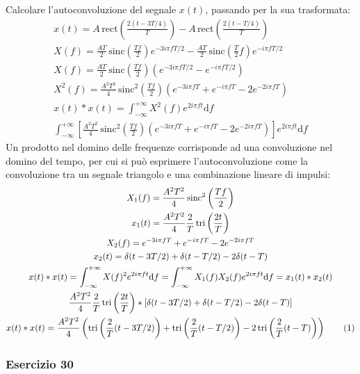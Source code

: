 \documentclass{article}
\newcommand{\rect}{\mathrm{rect}}
\newcommand{\sinc}{\mathrm{sinc}}
\newcommand{\tri}{\mathrm{tri}}
\newcommand{\df}{\mathrm{d}}
\newcommand{\tageq}{\tag{\stepcounter{equation}\theequation}}
\begin{document}
Calcolare l'autoconvoluzione del segnale $x(t)$, passando per la sua trasformata: 
\begin{gather*}
    x(t)=A\,\rect\displaystyle\left(\frac{2(t-3T/4)}{T}\right)-A\,\rect\displaystyle\left(\frac{2(t-T/4)}{T}\right)\\
    X(f)=\displaystyle\frac{AT}{2}\,\sinc\left(\frac{Tf}{2}\right)e^{-3i\pi fT/2}-\displaystyle\frac{AT}{2}\,\sinc\left(\frac{T}{2}f\right)e^{-i\pi fT/2}\\
    X(f)=\displaystyle\frac{AT}{2}\,\sinc\left(\frac{Tf}{2}\right)\left(e^{-3i\pi fT/2}-e^{-i\pi fT/2}\right)\\
    X^2(f)=\displaystyle\frac{A^2T^2}{4}\,\sinc^2\left(\frac{Tf}{2}\right)\left(e^{-3i\pi fT}+e^{-i\pi fT}-2e^{-2i\pi fT}\right)\\
    x(t)*x(t)=\displaystyle\int_{-\infty}^{+\infty}X^2(f)e^{2i\pi ft}\df f\\
    \displaystyle\int_{-\infty}^{+\infty}\left[\frac{A^2T^2}{4}\,\sinc^2\left(\frac{Tf}{2}\right)\left(e^{-3i\pi fT}+e^{-i\pi fT}-2e^{-2i\pi fT}\right)\right]e^{2i\pi ft}\df f
\end{gather*}
Un prodotto nel domino delle frequenze corrisponde ad una convoluzione nel domino del tempo, per cui si può esprimere l'autoconvoluzione come la convoluzione tra un segnale 
triangolo e una combinazione lineare di impulsi:
\begin{gather*}
    X_1(f)=\displaystyle\frac{A^2T^2}{4}\,\sinc^2\left(\frac{Tf}{2}\right)\\
    x_1(t)=\displaystyle\frac{A^2T^2}{4}\frac{2}{T}\,\tri \left(\frac{2t}{T}\right)\\
    X_2(f)=e^{-3i\pi fT}+e^{-i\pi fT}-2e^{-2i\pi fT}\\
    x_2(t)=\delta(t-3T/2)+\delta(t-T/2)-2\delta(t-T)\\
    x(t)*x(t)=\displaystyle\int_{-\infty}^{+\infty}X(f)^2e^{2i\pi ft}\df f=\int_{-\infty}^{+\infty}X_1(f)X_2(f)e^{2i\pi ft}\df f=x_1(t)*x_2(t)\\
    \displaystyle\frac{A^2T^2}{4}\frac{2}{T}\,\tri \left(\frac{2t}{T}\right)*\left[\delta(t-3T/2)+\delta(t-T/2)-2\delta(t-T)\right]\\
    x(t)*x(t)=\displaystyle\frac{A^2T^2}{4}\left(\tri \left(\frac{2}{T}(t-3T/2)\right)+\tri \left(\frac{2}{T}(t-T/2)\right)-2\,\tri \left(\frac{2}{T}(t-T)\right)\right)\tageq
\end{gather*}

\subsubsection*{Esercizio 30}
\end{document}

